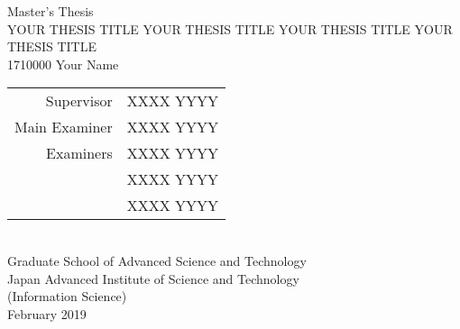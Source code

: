 \pagestyle{empty}
\begin{center}
Master's Thesis\\%
\vspace{100pt}
\MakeUppercase{Your Thesis Title Your Thesis Title Your Thesis Title Your Thesis Title}\\
\vspace{100pt}
1710000 %
\quad
Your Name\\
\vspace{100pt}
\begin{tabular}{rl}
Supervisor & XXXX YYYY\\
Main Examiner & XXXX YYYY\\
Examiners & XXXX YYYY\\
& XXXX YYYY\\
& XXXX YYYY
\end{tabular}\\
\vspace{100pt}
Graduate School of Advanced Science and Technology\\ %
Japan Advanced Institute of Science and Technology\\
(Information Science)\\ %
\vfill
February 2019\\ %
\vfill
\end{center}
\cleardoublepage